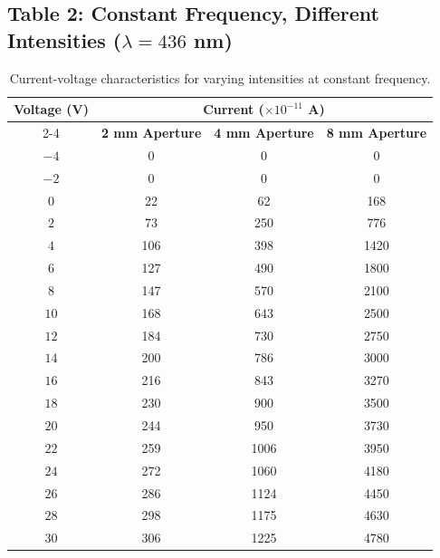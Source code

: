 \documentclass[12pt, a4paper]{article}
\begin{document}
\subsection*{Table 2: Constant Frequency, Different Intensities ($\lambda = 436$ nm)}
\begin{table}[H]
    \centering
    \begin{tabular}{cccc}
        \toprule
        \textbf{Voltage (V)} & \multicolumn{3}{c}{\textbf{Current ($\times 10^{-11}$ A)}} \\
        \cmidrule(lr){2-4}
        & \textbf{2 mm Aperture} & \textbf{4 mm Aperture} & \textbf{8 mm Aperture} \\
        \midrule
        $-4$ & 0 & 0 & 0 \\
        $-2$ & 0 & 0 & 0 \\
        $0$ & 22 & 62 & 168 \\
        $2$ & 73 & 250 & 776 \\
        $4$ & 106 & 398 & 1420 \\
        $6$ & 127 & 490 & 1800 \\
        $8$ & 147 & 570 & 2100 \\
        $10$ & 168 & 643 & 2500 \\
        $12$ & 184 & 730 & 2750 \\
        $14$ & 200 & 786 & 3000 \\
        $16$ & 216 & 843 & 3270 \\
        $18$ & 230 & 900 & 3500 \\
        $20$ & 244 & 950 & 3730 \\
        $22$ & 259 & 1006 & 3950 \\
        $24$ & 272 & 1060 & 4180 \\
        $26$ & 286 & 1124 & 4450 \\
        $28$ & 298 & 1175 & 4630 \\
        $30$ & 306 & 1225 & 4780 \\
        \bottomrule
    \end{tabular}
    \caption{Current-voltage characteristics for varying intensities at constant frequency.}
\end{table}
\end{document}

